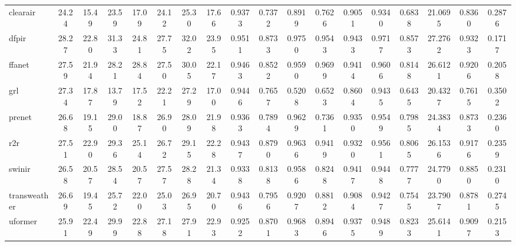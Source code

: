 \begin{table}[t]
\begin{tabular}{lccccccccccccccccc}
clearair & 24.24 & 15.49 & 23.59 & 17.09 & 24.12 & 25.30 & 17.66 & 0.9373 & 0.7372 & 0.8919 & 0.7626 & 0.9051 & 0.9340 & 0.6838 & 21.0695 & 0.8360 & 0.2876 \\
dfpir & 28.27 & 22.80 & 31.33 & 24.81 & 27.75 & 32.02 & 23.95 & 0.9511 & 0.8733 & 0.9750 & 0.9543 & 0.9433 & 0.9717 & 0.8573 & 27.2762 & 0.9323 & 0.1717 \\
ffanet & 27.59 & 21.94 & 28.21 & 28.84 & 27.50 & 30.05 & 22.17 & 0.9463 & 0.8522 & 0.9590 & 0.9699 & 0.9414 & 0.9606 & 0.8148 & 26.6121 & 0.9206 & 0.2058 \\
grl & 27.34 & 17.87 & 13.79 & 17.52 & 22.21 & 27.29 & 17.00 & 0.9446 & 0.7657 & 0.5208 & 0.6523 & 0.8604 & 0.9435 & 0.6435 & 20.4327 & 0.7615 & 0.3502 \\
prenet & 26.68 & 19.15 & 29.00 & 18.87 & 26.90 & 28.09 & 21.98 & 0.9363 & 0.7894 & 0.9629 & 0.7361 & 0.9350 & 0.9549 & 0.7985 & 24.3834 & 0.8733 & 0.2360 \\
r2r & 27.51 & 22.90 & 29.36 & 25.14 & 26.72 & 29.15 & 22.28 & 0.9437 & 0.8790 & 0.9636 & 0.9419 & 0.9320 & 0.9561 & 0.8065 & 26.1536 & 0.9176 & 0.2359 \\
swinir & 26.58 & 20.57 & 28.54 & 20.57 & 27.57 & 28.28 & 21.34 & 0.9338 & 0.8138 & 0.9586 & 0.8248 & 0.9417 & 0.9448 & 0.7777 & 24.7790 & 0.8850 & 0.2310 \\
transweather & 26.69 & 19.45 & 25.72 & 22.00 & 25.03 & 26.95 & 20.70 & 0.9436 & 0.7956 & 0.9207 & 0.8812 & 0.9084 & 0.9427 & 0.7545 & 23.7907 & 0.8781 & 0.2745 \\
uformer & 25.91 & 22.49 & 29.99 & 22.88 & 27.18 & 27.91 & 22.93 & 0.9252 & 0.8701 & 0.9683 & 0.8946 & 0.9375 & 0.9489 & 0.8233 & 25.6141 & 0.9097 & 0.2153 \\
\bottomrule
\end{tabular}
\end{table}
